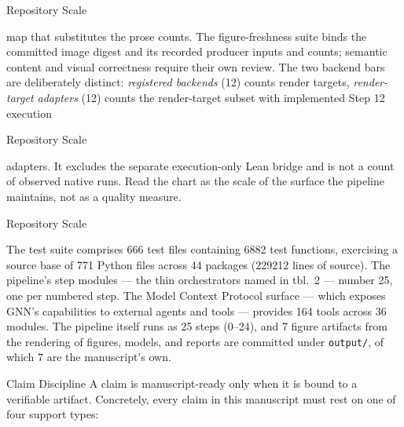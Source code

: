 \documentclass[
  ignorenonframetext,
]{beamer}
\newenvironment{archivecaptionframe}{\par\begingroup}{\par\endgroup}
\begin{document}
\begin{frame}{Repository Scale}

\begin{archivecaptionframe}

map that substitutes the prose counts. The figure-freshness suite binds
the committed image digest and its recorded producer inputs and counts;
semantic content and visual correctness require their own review. The
two backend bars are deliberately distinct: \emph{registered backends}
(12) counts render targets, \emph{render-target adapters} (12) counts
the render-target subset with implemented Step 12 execution

\end{archivecaptionframe}

\end{frame}

\begin{frame}{Repository Scale}

\begin{archivecaptionframe}

adapters. It excludes the separate execution-only Lean bridge and is not
a count of observed native runs. Read the chart as the scale of the
surface the pipeline maintains, not as a quality measure.

\end{archivecaptionframe}

\end{frame}

\begin{frame}{Repository Scale}

The test suite comprises 666 test files containing 6882 test functions,
exercising a source base of 771 Python files across 44 packages (229212
lines of source). The pipeline's step modules --- the thin orchestrators
named in tbl.~2 --- number 25, one per numbered
step. The Model Context Protocol surface --- which exposes GNN's
capabilities to external agents and tools --- provides 164 tools across
36 modules. The pipeline itself runs as 25 steps (0--24), and 7 figure
artifacts from the rendering of figures, models, and reports are
committed under \texttt{output/}, of which 7 are the manuscript's own.
\end{frame}

\begin{frame}{Claim Discipline}
\protect{}\label{claim-discipline}
A claim is manuscript-ready only when it is bound to a verifiable
artifact. Concretely, every claim in this manuscript must rest on one of
four support types:

\end{frame}
\end{document}
